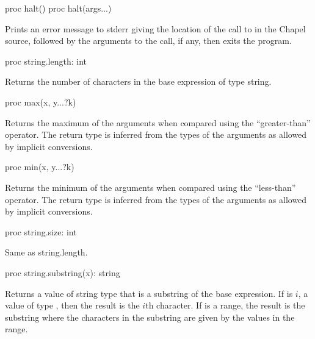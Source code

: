 \begin{protohead}
proc halt()
proc halt(args...)
\end{protohead}
\begin{protobody}
Prints an error message to stderr giving the location of the call to 
in the Chapel source, followed by the arguments to the call, if any,
then exits the program.
\end{protobody}

\begin{protohead}
proc string.length: int
\end{protohead}
\begin{protobody}
Returns the number of characters in the base expression of type string.
\end{protobody}

\begin{protohead}
proc max(x, y...?k)
\end{protohead}
\begin{protobody}
Returns the maximum of the arguments when compared using the
``greater-than'' operator.  The return type is inferred from the types
of the arguments as allowed by implicit conversions.
\end{protobody}

\begin{protohead}
proc min(x, y...?k)
\end{protohead}
\begin{protobody}
Returns the minimum of the arguments when compared using the
``less-than'' operator.  The return type is inferred from the types of
the arguments as allowed by implicit conversions.
\end{protobody}

\begin{protohead}
proc string.size: int
\end{protohead}
\begin{protobody}
Same as string.length.
\end{protobody}

\begin{protohead}
proc string.substring(x): string
\end{protohead}
\begin{protobody}
Returns a value of string type that is a substring of the base
expression.  If  is $i$, a value of type , then the
result is the $i$th character.  If  is a range, the result is
the substring where the characters in the substring are given by the
values in the range.
\end{protobody}

